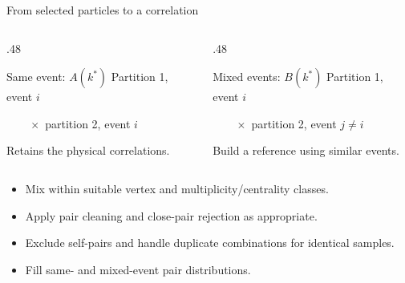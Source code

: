 \begin{frame}{From selected particles to a correlation}
        \begin{columns}[T]
                \begin{column}{.48\textwidth}
                        \begin{block}{Same event: $A(k^*)$}
                                Partition 1, event $i$\par
                                $\qquad\times$ partition 2, event
                                $i$\par\medskip
                                Retains the physical correlations.
                        \end{block}
                \end{column}
                \begin{column}{.48\textwidth}
                        \begin{block}{Mixed events: $B(k^*)$}
                                Partition 1, event $i$\par
                                $\qquad\times$ partition 2, event
                                $j\ne i$\par\medskip
                                Build a reference using similar events.
                        \end{block}
                \end{column}
        \end{columns}
        \begin{itemize}
                \item Mix within suitable vertex and
                        multiplicity/centrality classes.
                \item Apply pair cleaning and close-pair rejection as
                        appropriate.
                \item Exclude self-pairs and handle duplicate
                        combinations for identical samples.
                \item Fill same- and mixed-event pair distributions.
        \end{itemize}
\end{frame}

